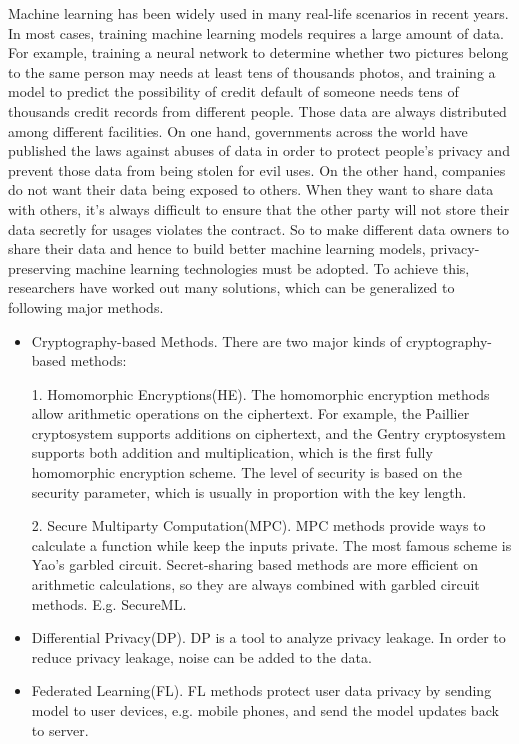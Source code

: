 Machine learning has been widely used in many real-life scenarios in recent years. In most cases, training machine learning models requires a large amount of data. For example, training a neural network to determine whether two pictures belong to the same person may needs at least tens of thousands photos, and training a model to predict the possibility of credit default of someone needs tens of thousands credit records from different people. Those data are always distributed among different facilities. On one hand, governments across the world have published the laws against abuses of data in order to protect people's privacy and prevent those data from being stolen for evil uses. On the other hand, companies do not want their data being exposed to others. When they want to share data with others, it's always difficult to ensure that the other party will not store their data secretly for usages violates the contract. So to make different data owners to share their data and hence to build better machine learning models, privacy-preserving machine learning technologies must be adopted.
To achieve this, researchers have worked out many solutions, which can be generalized to following major methods. 
\begin{itemize}
    \item Cryptography-based Methods. There are two major kinds of cryptography-based methods: 
    
    1. Homomorphic Encryptions(HE). The homomorphic encryption methods allow arithmetic operations on the ciphertext. For example, the Paillier cryptosystem\cite{paillier1999} supports additions on ciphertext, and the Gentry cryptosystem supports both addition and multiplication, which is the first fully homomorphic encryption scheme. The level of security is based on the security parameter, which is usually in proportion with the key length.
    
    2. Secure Multiparty Computation(MPC). MPC methods provide ways to calculate a function while keep the inputs private. The most famous scheme is Yao's garbled circuit\cite{lindell2009gcproof}. Secret-sharing based methods are more efficient on arithmetic calculations, so they are always combined with garbled circuit methods. E.g. SecureML\cite{mohassel2017secureml}.
    \item Differential Privacy(DP)\cite{dwork2014dp}. DP is a tool to analyze privacy leakage. In order to reduce privacy leakage, noise can be added to the data.
    \item Federated Learning(FL)\cite{mcmahan17fed}. FL methods protect user data privacy by sending model to user devices, e.g. mobile phones, and send the model updates back to server.
\end{itemize}


